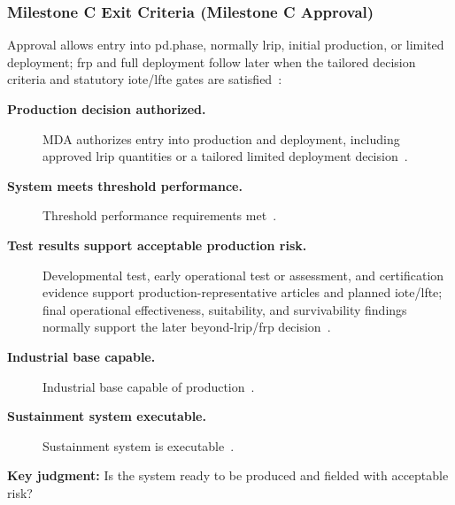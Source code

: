\documentclass[../main.tex]{subfiles}
\begin{document}
\subsubsection{Milestone C Exit Criteria (Milestone C Approval)}
Approval allows entry into \ac{pd.phase}, normally \ac{lrip}, initial production, or limited deployment; \ac{frp} and full deployment follow later when the tailored decision criteria and statutory \ac{iote}/\ac{lfte} gates are satisfied~\autocite{DoDI5000-85,USC-10-4171,USC-10-4172,edo-3-3-2-acq-milestones-phases-2025}:
\begin{description}
  \item[\textbf{Production decision authorized.}] MDA authorizes entry into production and deployment, including approved \ac{lrip} quantities or a tailored limited deployment decision~\autocite{DoDI5000-85,edo-3-3-2-acq-milestones-phases-2025}.
  \item[\textbf{System meets threshold performance.}] Threshold performance requirements met~\autocite{DoDI5000-85,edo-3-3-2-acq-milestones-phases-2025}.
  \item[\textbf{Test results support acceptable production risk.}] Developmental test, early operational test or assessment, and certification evidence support production-representative articles and planned \ac{iote}/\ac{lfte}; final operational effectiveness, suitability, and survivability findings normally support the later beyond-\ac{lrip}/\ac{frp} decision~\autocite{DoDI5000-85,USC-10-4171,USC-10-4172,edo-3-3-2-acq-milestones-phases-2025}.
  \item[\textbf{Industrial base capable.}] Industrial base capable of production~\autocite{DoDI5000-85,DoD-MRL-Deskbook-2025,edo-3-3-2-acq-milestones-phases-2025}.
  \item[\textbf{Sustainment system executable.}] Sustainment system is executable~\autocite{DoDI5000-85,DoDI5000-91,edo-3-3-2-acq-milestones-phases-2025}.
\end{description}
\textbf{Key judgment:} Is the system ready to be produced and fielded with acceptable risk?~\autocite{DoDI5000-85,edo-3-3-2-acq-milestones-phases-2025}

\end{document}
